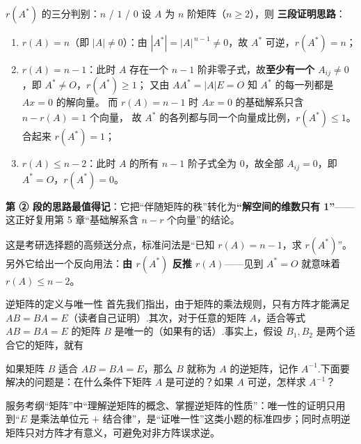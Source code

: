 \begin{fdeep}{$r(A^{*})$ 的三分判别：$n$ / $1$ / $0$}
设 $A$ 为 $n$ 阶矩阵（$n\ge2$），则
\textbf{三段证明思路}：
\begin{enumerate}[leftmargin=2.2em,itemsep=0.25em]
\item $r(A)=n$（即 $|A|\ne0$）：由 $|A^{*}|=|A|^{\,n-1}\ne0$，故 $A^{*}$ 可逆，$r(A^{*})=n$；
\item $r(A)=n-1$：此时 $A$ 存在一个 $n-1$ 阶非零子式，故\textbf{至少有一个 $A_{ij}\ne0$}，即 $A^{*}\ne O$，$r(A^{*})\ge1$；
      又由 $AA^{*}=|A|E=O$ 知 $A^{*}$ 的每一列都是 $Ax=0$ 的解向量。
      而 $r(A)=n-1$ 时 $Ax=0$ 的基础解系只含 $n-r(A)=1$ 个向量，
      故 $A^{*}$ 的各列都与同一个向量成比例，$r(A^{*})\le1$。合起来 $r(A^{*})=1$；
\item $r(A)\le n-2$：此时 $A$ 的所有 $n-1$ 阶子式全为 $0$，故全部 $A_{ij}=0$，即 $A^{*}=O$，$r(A^{*})=0$。
\end{enumerate}
\textbf{第 ② 段的思路最值得记}：它把“伴随矩阵的秩”转化为\textbf{“解空间的维数只有 1”}\allowbreak——
这正好复用第 5 章“基础解系含 $n-r$ 个向量”的结论。

\fbref{}这是考研选择题的高频送分点，标准问法是“已知 $r(A)=n-1$，求 $r(A^{*})$”。
另外它给出一个反向用法：\textbf{由 $r(A^{*})$ 反推 $r(A)$}——见到 $A^{*}=O$ 就意味着 $r(A)\le n-2$。
\end{fdeep}

\begin{fdeep}{逆矩阵的定义与唯一性}
首先我们指出，由于矩阵的乘法规则，只有方阵才能满足 $AB=BA=E$（读者自己证明）.其次，对于任意的矩阵 $A$，适合等式 $AB=BA=E$ 的矩阵 $B$ 是唯一的（如果有的话）.事实上，假设 $B_1,B_2$ 是两个适合它的矩阵，就有

\quad 如果矩阵 $B$ 适合 $AB=BA=E$，那么 $B$ 就称为 $A$ 的逆矩阵，记作 $A^{-1}$.下面要解决的问题是：在什么条件下矩阵 $A$ 是可逆的？如果 $A$ 可逆，怎样求 $A^{-1}$？

\fbref{}服务考纲“矩阵”中“理解逆矩阵的概念、掌握逆矩阵的性质”：唯一性的证明只用到“$E$ 是乘法单位元 $+$ 结合律”，是“证唯一性”这类小题的标准四步；同时点明逆矩阵只对方阵才有意义，可避免对非方阵误求逆。
\end{fdeep}

